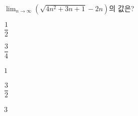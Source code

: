 $\displaystyle\lim_{n\to\infty}(\sqrt{4n^2+3n+1}-2n)$의 값은?
\begin{choices32}{\rule[-3ex]{0pt}{8ex}$\dfrac{1}{2}$}{\rule[-3ex]{0pt}{8ex}$\dfrac{3}{4}$}{\rule[-3ex]{0pt}{8ex}$1$}{\rule[-3ex]{0pt}{8ex}$\dfrac{3}{2}$}{\rule[-3ex]{0pt}{8ex}$3$}\end{choices32}
